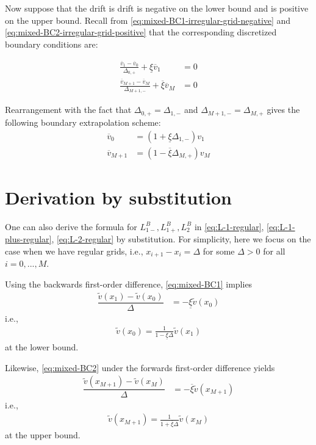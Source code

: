 \documentclass[11pt]{article}
\theoremstyle{definition}
\begin{document}
Now suppose that the drift is drift is negative on the lower bound and is positive on the upper bound. Recall from \eqref{eq:mixed-BC1-irregular-grid-negative} and \eqref{eq:mixed-BC2-irregular-grid-positive} that the corresponding discretized boundary conditions are:

\begin{align}
\frac{\overline{v}_1 - \overline{v}_0}{\Delta_{0,+}} + \underline{\xi} \overline{v}_1 &= 0 \\
\frac{\overline{v}_{M+1} - \overline{v}_M}{\Delta_{M+1,-}} + \overline{\xi} \overline{v}_{M} &= 0 
\end{align}

Rearrangement with the fact that $\Delta_{0,+} = \Delta_{1,-}$ and $\Delta_{M+1,-} = \Delta_{M,+}$ gives the following boundary extrapolation scheme:
\begin{align}
\overline{v}_0 &= (1+\underline{\xi} \Delta_{1,-} ) {v}_1 \\
\overline{v}_{M+1} &= (1-\overline{\xi} \Delta_{M,+} ) {v}_M
\end{align}

\section{Derivation by substitution}
One can also derive the formula for $L_{1-}^B, L_{1+}^B, L_2^B$ in \eqref{eq:L-1-regular}, \eqref{eq:L-1-plus-regular}, \eqref{eq:L-2-regular} by substitution. For simplicity, here we focus on the case when we have regular grids, i.e., $x_{i+1} - x_i = \Delta$ for some $\Delta > 0$ for all $i = 0, ..., M$.

Using the backwards first-order difference, \eqref{eq:mixed-BC1} implies
\begin{align}
\dfrac{\tilde{v}({x_{1}}) - \tilde{v}(x_{0})}{\Delta} &= - \underline{\xi} \tilde{v}({x_{0}})
\end{align}
i.e.,
\begin{align}\label{eq:BC1-extrapolation-uniform}
\tilde{v}(x_0) = \frac{1}{1-\underline{\xi} \Delta } \tilde{v}(x_1)
\end{align}
at the lower bound.

Likewise, \eqref{eq:mixed-BC2} under the forwards first-order difference yields
\begin{align}
\dfrac{\tilde{v}(x_{M+1}) - \tilde{v}({x_{M}})}{\Delta} &= - \overline{\xi} \tilde{v}({x_{M+1} })
\end{align}
i.e.,
\begin{align}\label{eq:BC2-extrapolation-uniform}
\tilde{v}(x_{M+1}) = \frac{1}{1+\overline{\xi} \Delta } \tilde{v}(x_M)
\end{align}
at the upper bound.
\end{document}
